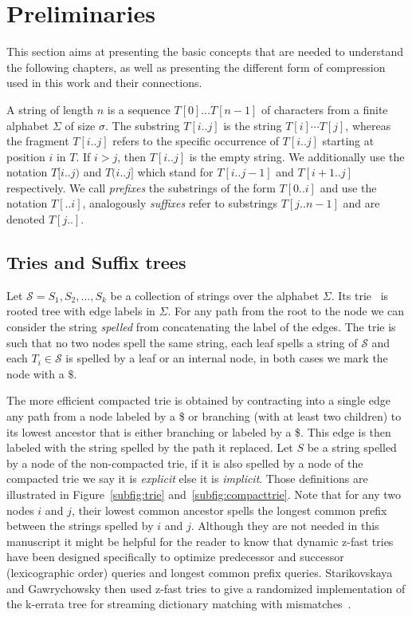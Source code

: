 \section{Preliminaries}\label{sec:prelim}


This section aims at presenting the basic concepts that are needed to understand the following chapters, as well as presenting the different form of compression used in this work and their connections.

A string of length $n$ is a sequence $T[0] \dots T[n-1]$ of characters from a finite alphabet $\Sigma$ of size $\sigma$. The substring $T[i..j]$ is the string $T[i] \cdots T[j]$, whereas the fragment $T[i..j]$ refers to the specific occurrence of $T[i..j]$ starting at position $i$ in $T$. If $i > j$, then $T[i..j]$ is the empty string. We additionally use the notation $T[i..j)$ and $T(i..j]$ which stand for $T[i..j-1]$ and $T[i+1..j]$ respectively. We call \emph{prefixes} the substrings of the form $T[0..i]$ and use the notation $T[..i]$, analogously \emph{suffixes} refer to substrings $T[j..n-1]$ and are denoted $T[j..]$.

\subsection{Tries and Suffix trees}

Let $\mathcal{S} = {S_1,S_2, ..., S_k}$ be a collection of strings over the alphabet $\Sigma$. Its trie~\cite{thue1912gegenseitige,de1959file,fredkin1960trie} is rooted tree with edge labels in $\Sigma$.
For any path from the root to the node we can consider the string \emph{spelled} from concatenating the label of the edges. The trie is such that no two nodes spell the same string, each leaf spells a string of $\mathcal{S}$ and each $T_i \in \mathcal{S}$ is spelled by a leaf or an internal node, in both cases we mark the node with a $\$ $.

The more efficient compacted trie is obtained by contracting  into a single edge any path from a node labeled by a \$ or branching (with at least two children) to its lowest ancestor that is either branching or labeled by a \$.
This edge is then labeled with the string spelled by the path it replaced.
Let $S$ be a string spelled by a node of the non-compacted trie, if it is also spelled by a node of the compacted trie we say it is \emph{explicit} else it is \emph{implicit}. Those definitions are illustrated in Figure~\ref{subfig:trie} and~\ref{subfig:compacttrie}. Note that for any two nodes $i$ and $j$, their lowest common ancestor spells the longest common prefix between the strings spelled by $i$ and $j$.
%
Although they are not needed in this manuscript it might be helpful for the reader to know that dynamic z-fast tries~\cite{belazzougui2010dynamic} have been designed specifically to optimize predecessor and successor (lexicographic order) queries and longest common prefix queries. Starikovskaya and Gawrychowsky then used z-fast tries to give a randomized implementation of the k-errata tree for streaming dictionary matching with mismatches~\cite{gawrychowski2019streaming}.

